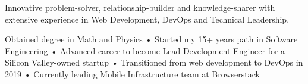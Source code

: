 

\begin{cvparagraph}

Innovative problem-solver, relationship-builder and knowledge-sharer with extensive experience in Web Development, DevOps and Technical Leadership.

Obtained degree in Math and Physics • Started my 15+ years path in Software Engineering • Advanced career to become Lead Development Engineer for a Silicon Valley-owned startup • Transitioned from web development to DevOps in 2019 • Currently leading Mobile Infrastructure team at Browserstack

\end{cvparagraph}
